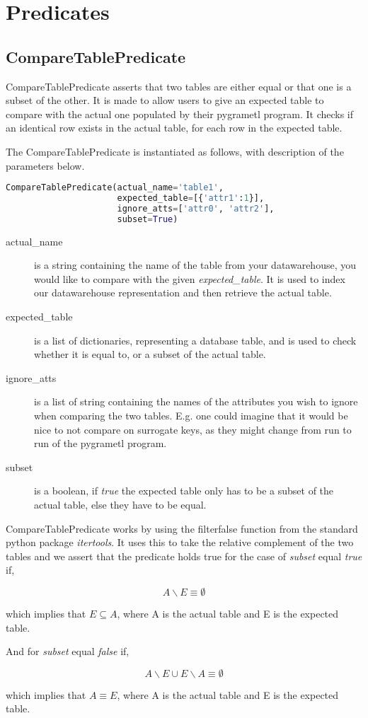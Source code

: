 \section{Predicates}


\subsection{CompareTablePredicate}
CompareTablePredicate asserts that two tables are either equal or that one is a subset of the other. It is made to allow users to give an expected table to compare with the actual one populated by their pygrametl program. It checks if an identical row exists in the actual table, for each row in the expected table. 

The CompareTablePredicate is instantiated as follows, with description of the parameters below.
\begin{lstlisting}[basicstyle=\scriptsize, language=Python]
CompareTablePredicate(actual_name='table1',
                      expected_table=[{'attr1':1}],
                      ignore_atts=['attr0', 'attr2'],
                      subset=True)
\end{lstlisting}
\begin{description}
\item [actual\_name] is a string containing the name of the table from your datawarehouse, you would like to compare with the given \textit{expected\_table}. It is used to index our datawarehouse representation and then retrieve the actual table.
\item [expected\_table] is a list of dictionaries, representing a database table, and is used to check whether it is equal to, or a subset of the actual table.
\item [ignore\_atts] is a list of string containing the names of the attributes you wish to ignore when comparing the two tables. E.g. one could imagine that it would be nice to not compare on surrogate keys, as they might change from run to run of the pygrametl program.
  \item [subset] is a boolean, if \textit{true} the expected table only has to be a subset of the actual table, else they have to be equal.
\end{description}

CompareTablePredicate works by using the filterfalse function from the standard python package \textit{itertools}. It uses this to take the relative complement of the two tables and we assert that the predicate holds true for the case of \textit{subset} equal \textit{true} if,

\[ A \backslash E \equiv \emptyset \]

\noindent which implies that $E \subseteq A$, where A is the actual table and E is the expected table.

And for \textit{subset} equal \textit{false} if,

\[ A \backslash E \cup E \backslash A \equiv \emptyset \]

\noindent which implies that $A \equiv E$, where A is the actual table and E is the expected table.

